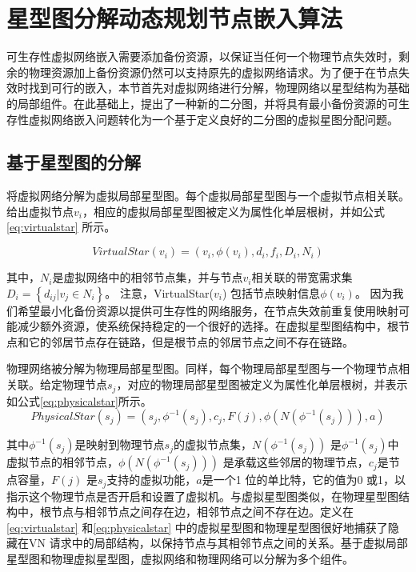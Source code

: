 \section{星型图分解动态规划节点嵌入算法}
可生存性虚拟网络嵌入需要添加备份资源，以保证当任何一个物理节点失效时，剩余的物理资源加上备份资源仍然可以支持原先的虚拟网络请求。为了便于在节点失效时找到可行的嵌入，本节首先对虚拟网络进行分解，物理网络以星型结构为基础的局部组件。在此基础上，提出了一种新的二分图，并将具有最小备份资源的可生存性虚拟网络嵌入问题转化为一个基于定义良好的二分图的虚拟星图分配问题。
\subsection{基于星型图的分解}
将虚拟网络分解为虚拟局部星型图。每个虚拟局部星型图与一个虚拟节点相关联。给出虚拟节点$v_i$，相应的虚拟局部星型图被定义为属性化单层根树，并如公式\ref{eq:virtualstar} 所示。

\begin{equation}
VirtualStar(v_i)=(v_i, \phi(v_i), d_i, f_i, D_i, N_i)
\label{eq:virtualstar}
\end{equation}


其中，$N_i$是虚拟网络中的相邻节点集，并与节点$v_i$相关联的带宽需求集${D_i} = \left\{ {{d_{ij}}|{v_j} \in {N_i}} \right\} $。 注意，VirtualStar($v_i$) 包括节点映射信息$\phi(v_i)$。 因为我们希望最小化备份资源以提供可生存性的网络服务，在节点失效前重复使用映射可能减少额外资源，使系统保持稳定的一个很好的选择。在虚拟星型图结构中，根节点和它的邻居节点存在链路，但是根节点的邻居节点之间不存在链路。

物理网络被分解为物理局部星型图。同样，每个物理局部星型图与一个物理节点相关联。给定物理节点$s_j$，对应的物理局部星型图被定义为属性化单层根树，并表示如公式\ref{eq:physicalstar}所示。
\begin{equation}
PhysicalStar(s_j)=(s_j, \phi^{-1}( s_j), c_j, F(j), \phi(N(\phi^{-1}( s_j))), a)
\label{eq:physicalstar}
\end{equation}

其中$\phi^{-1}( s_j)$是映射到物理节点$s_j$的虚拟节点集，$N(\phi^{-1}( s_j))$ 是$\phi^{-1}( s_j)$中虚拟节点的相邻节点，$\phi(N(\phi^{-1}( s_j)))$ 是承载这些邻居的物理节点，$c_j$是节点容量，$F(j)$ 是$s_j$支持的虚拟功能，$a$是一个1 位的单比特，它的值为0 或1，以指示这个物理节点是否开启和设置了虚拟机。与虚拟星型图类似，在物理星型图结构中，根节点与相邻节点之间存在边，相邻节点之间不存在边。定义在\ref{eq:virtualstar} 和\ref{eq:physicalstar} 中的虚拟星型图和物理星型图很好地捕获了隐藏在VN 请求中的局部结构，以保持节点与其相邻节点之间的关系。基于虚拟局部星型图和物理虚拟星型图，虚拟网络和物理网络可以分解为多个组件。

